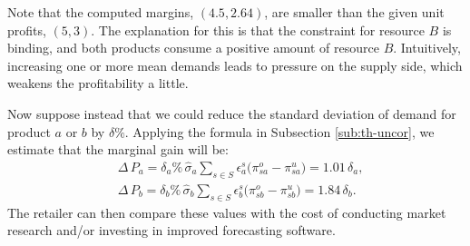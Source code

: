 \documentclass[a4paper,11pt]{article}
\begin{document}
Note that the computed margins, $(4.5,2.64)$, are smaller than the given
unit profits, $(5,3)$. The explanation for this is that the constraint for
resource $B$ is binding, and both products consume a positive amount of
resource $B$. Intuitively, increasing one or more mean demands leads to pressure on the supply side, which weakens the profitability a little.

Now suppose instead that we could reduce the standard deviation of demand
for product $a$ or $b$ by $\delta \%$. Applying the formula in Subsection
\ref{sub:th-uncor}, we estimate that the marginal gain will be:
\[
\begin{aligned}
    &\Delta \, P_a = \delta_a \% \, \hat{\sigma}_a
    \sum_{s \in S} \epsilon_a^s \big(\pi_{sa}^o - \pi_{sa}^u \big) = 1.01 \, \delta_a,\\
    &\Delta \, P_b = \delta_b \% \, \hat{\sigma}_b
    \sum_{s \in S} \epsilon_b^s \big(\pi_{sb}^o - \pi_{sb}^u \big) = 1.84 \, \delta_b.
\end{aligned}
\]
The retailer can then compare these
values with the cost of conducting market research and/or investing in
improved forecasting software.
\end{document}
